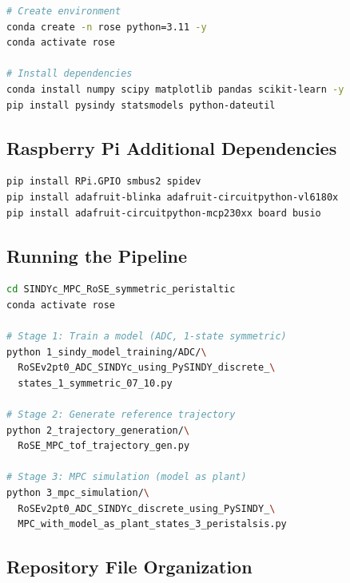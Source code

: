 \documentclass[11pt,a4paper]{article}
\begin{document}
\begin{codebox}
\begin{lstlisting}[language=bash]
# Create environment
conda create -n rose python=3.11 -y
conda activate rose

# Install dependencies
conda install numpy scipy matplotlib pandas scikit-learn -y
pip install pysindy statsmodels python-dateutil
\end{lstlisting}
\end{codebox}

\subsection{Raspberry Pi Additional Dependencies}

\begin{codebox}
\begin{lstlisting}[language=bash]
pip install RPi.GPIO smbus2 spidev
pip install adafruit-blinka adafruit-circuitpython-vl6180x
pip install adafruit-circuitpython-mcp230xx board busio
\end{lstlisting}
\end{codebox}

\subsection{Running the Pipeline}

\begin{codebox}
\begin{lstlisting}[language=bash]
cd SINDYc_MPC_RoSE_symmetric_peristaltic
conda activate rose

# Stage 1: Train a model (ADC, 1-state symmetric)
python 1_sindy_model_training/ADC/\
  RoSEv2pt0_ADC_SINDYc_using_PySINDY_discrete_\
  states_1_symmetric_07_10.py

# Stage 2: Generate reference trajectory
python 2_trajectory_generation/\
  RoSE_MPC_tof_trajectory_gen.py

# Stage 3: MPC simulation (model as plant)
python 3_mpc_simulation/\
  RoSEv2pt0_ADC_SINDYc_discrete_using_PySINDY_\
  MPC_with_model_as_plant_states_3_peristalsis.py
\end{lstlisting}
\end{codebox}

\subsection{Repository File Organization}
\end{document}

